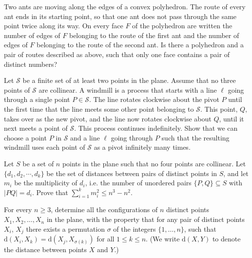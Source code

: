 \documentclass[11pt]{scrartcl}
\begin{document}
\begin{problem} %
    	Two ants are moving along the edges of a convex polyhedron. The route of every ant ends in its starting point, so that one ant does not pass through the same point twice along its way. On every face $F$ of the polyhedron are written the number of edges of $F$ belonging to the route of the first ant and the number of edges of $F$ belonging to the route of the second ant. Is there a polyhedron and a pair of routes described as above, such that only one face contains a pair of distinct numbers?
\end{problem}

\begin{problem} %
    Let $\mathcal{S}$ be a finite set of at least two points in the plane. Assume that no three points of $\mathcal S$ are collinear. A windmill is a process that starts with a line $\ell$ going through a single point $P \in \mathcal S$. The line rotates clockwise about the pivot $P$ until the first time that the line meets some other point belonging to $\mathcal S$. This point, $Q$, takes over as the new pivot, and the line now rotates clockwise about $Q$, until it next meets a point of $\mathcal S$. This process continues indefinitely.
Show that we can choose a point $P$ in $\mathcal S$ and a line $\ell$ going through $P$ such that the resulting windmill uses each point of $\mathcal S$ as a pivot infinitely many times.
\end{problem}

\begin{problem} %
    Let $S$ be a set of $n$ points in the plane such that no four points are collinear. Let $\{d_1,d_2,\cdots ,d_k\}$ be the set of distances between pairs of distinct points in $S$, and let $m_i$ be the multiplicity of $d_i$, i.e. the number of unordered pairs $\{P,Q\}\subseteq S$ with $|PQ|=d_i$. Prove that $\sum_{i=1}^k m_i^2\leq n^3-n^2$.
\end{problem}

\begin{problem} %
    	For every $n\geq 3$, determine all the configurations of $n$ distinct points $X_1,X_2,\ldots,X_n$ in the plane, with the property that for any pair of distinct points $X_i$, $X_j$ there exists a permutation $\sigma$ of the integers $\{1,\ldots,n\}$, such that $\textrm{d}(X_i,X_k) = \textrm{d}(X_j,X_{\sigma(k)})$ for all $1\leq k \leq n$.
(We write $\textrm{d}(X,Y)$ to denote the distance between points $X$ and $Y$.)
\end{problem}
\end{document}
